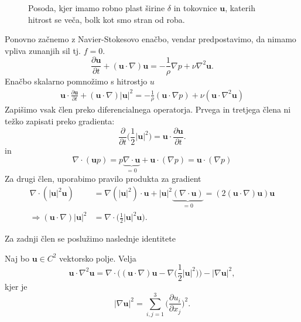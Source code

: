 \documentclass[mat2, tisk]{fmfdelo}
\newcommand{\bd}{\textbf}
\begin{document}
\begin{figure}[h!]
\caption{Posoda, kjer imamo robno plast širine $\delta$ in tokovnice $\bd{u}$, katerih hitrost se veča, bolk kot smo stran od roba.}
\end{figure}

Ponovno začnemo z Navier-Stokesovo enačbo, vendar predpostavimo, da nimamo vpliva zunanjih sil tj. $f = 0$.
$$
\frac{\partial \bd{u}}{\partial t} + (\bd{u}\cdot \nabla)\bd{u} = - \frac{1}{\rho}\nabla p + \nu \nabla^2 \bd{u}.
$$
Enačbo skalarno pomnožimo s hitrostjo $u$
\begin{align*}
\bd{u}\cdot\frac{\partial \bd{u}}{\partial t} + (\bd{u}\cdot \nabla)|\bd{u}|^2 = - \frac{1}{\rho}(\bd{u}\cdot\nabla p) + \nu (\bd{u}\cdot\nabla^2 \bd{u})
\end{align*}
Zapišimo vsak člen preko diferencialnega operatorja. Prvega in tretjega člena ni težko zapisati preko gradienta:
$$
\frac{\partial}{\partial t} \Big(\frac{1}{2} \bd{|u|}^2 \Big) = \bd{u}\cdot \frac{\partial \bd{u}}{\partial t}.
$$
in
$$
\nabla \cdot (\bd{u}p) = p\underbrace{\nabla\cdot \bd{u}}_{=0} + \bd{u}\cdot (\nabla p) = \bd{u}\cdot (\nabla p)
$$
Za drugi člen, uporabimo pravilo produkta za gradient 
\begin{align*}
\nabla \cdot (|\bd{u}|^2 \bd{u}) &= \nabla(|\bd{u}|^2) \cdot \bd{u} + |\bd{u}|^2 \underbrace{(\nabla \cdot \bd{u})}_{= 0} =  (2(\bd{u}\cdot\nabla)\bd{u})\bd{u}\\[2mm]
\Longrightarrow (\bd{u}\cdot\nabla)|\bd{u}|^2 &= \nabla \cdot \Big(\frac{1}{2} |\bd{u}|^2 \bd{u}\Big).
\end{align*}

Za zadnji člen se poslužimo naslednje identitete
\begin{lema}
Naj bo $\bd{u} \in C^2$ vektorsko polje.
Velja
\begin{equation}
\bd{u}\cdot \nabla^2 \bd{u} = \nabla\cdot\Big((\bd{u}\cdot \nabla)\bd{u} - \nabla\Big(\frac{1}{2} |\bd{u}|^2\Big)\Big) - |\nabla \bd{u}|^2,
\end{equation}
kjer je 
\begin{equation}
\label{gradnorm}
  |\nabla \bd{u}|^2 = \sum_{i,j=1}^3 \Big(\frac{\partial u_i}{\partial x_j}\Big)^2.
\end{equation}
\end{lema}
\end{document}
